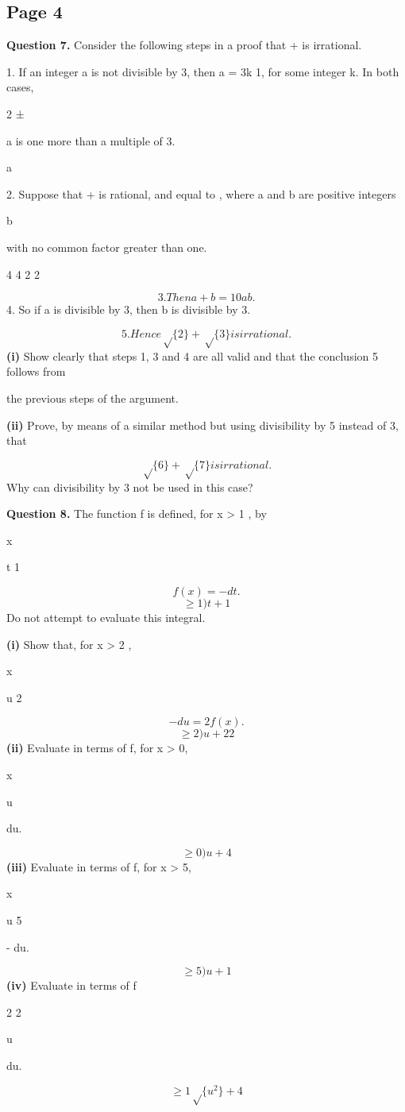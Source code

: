 \documentclass[12pt]{article}
\begin{document}
\subsection*{Page 4}
\begin{flushleft}
\bigskip\textbf{Question 7.} Consider the following steps in a proof that  +  is irrational.\par
1. If an integer a is not divisible by 3, then a = 3k 1, for some integer k. In both cases,\par
2 ±\par
a is one more than a multiple of 3.\par
a\par
2. Suppose that  +  is rational, and equal to , where a and b are positive integers\par
b\par
with no common factor greater than one.\par
4 4 2 2\par
\[3. Then a + b = 10a b .\]
4. So if a is divisible by 3, then b is divisible by 3.\par
\[5. Hence \sqrt\{2\} + \sqrt\{3\} is irrational.\]
\textbf{(i)} Show clearly that steps 1, 3 and 4 are all valid and that the conclusion 5 follows from\par
the previous steps of the argument.\par
\textbf{(ii)} Prove, by means of a similar method but using divisibility by 5 instead of 3, that\par
\[\sqrt\{6\} + \sqrt\{7\} is irrational.\]
Why can divisibility by 3 not be used in this case?\par
\bigskip\textbf{Question 8.} The function f is defined, for x > 1 , by\par
x\par
t 1\par
\[f(x) = - dt.\]
\[\geq1 ) t + 1\]
Do not attempt to evaluate this integral.\par
\textbf{(i)} Show that, for x > 2 ,\par
x\par
u 2\par
\[- du = 2 f( x).\]
\[\geq2 ) u + 2 2\]
\textbf{(ii)} Evaluate in terms of f, for x > 0,\par
x\par
u\par
du.\par
\[\geq0 ) u + 4\]
\textbf{(iii)} Evaluate in terms of f, for x > 5,\par
x\par
u 5\par
- du.\par
\[\geq5 ) u + 1\]
\textbf{(iv)} Evaluate in terms of f\par
2 2\par
u\par
du.\par
\[\geq1 \sqrt\{u^2\} + 4\]
\end{flushleft}
\end{document}
